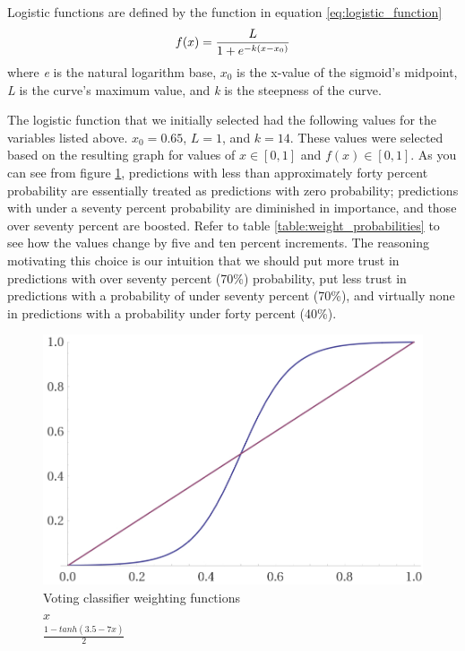 Logistic functions are defined by the function in equation \ref{eq:logistic_function}
\begin{equation}
    f(x)=\frac{L}{1+e^{-k(x-x_0)}}\\ 
    \label{eq:logistic_function}
\end{equation}
where \textit{e} is the natural logarithm base, \textit{$x_0$} is the x-value of the sigmoid's midpoint, \textit{L} is the curve's maximum value, and \textit{k} is the steepness of the curve.

The logistic function that we initially selected had the following values for the variables listed above. $x_0=0.65$, $L=1$, and $k=14$. These values were selected based on the resulting graph for values of $x \in [0, 1]$ and $f(x) \in [0, 1]$. As you can see from figure \ref{graph:weights}, predictions with less than approximately forty percent probability are essentially treated as predictions with zero probability; predictions with under a seventy percent probability are diminished in importance, and those over seventy percent are boosted. Refer to table \ref{table:weight_probabilities} to see how the values change by five and ten percent increments. The reasoning motivating this choice is our intuition that we should put more trust in predictions with over seventy percent (70\%) probability, put less trust in predictions with a probability of under seventy percent  (70\%), and virtually none in predictions with a probability under forty percent (40\%).

\begin{figure}
  \includegraphics[width=\linewidth]{./images/weight_graph}
\caption{\label{graph:weights}Voting classifier weighting functions\\\protect\blueline$x$\\
\protect\redline $\frac{1-tanh(3.5-7x)}{2}$}
\end{figure}

